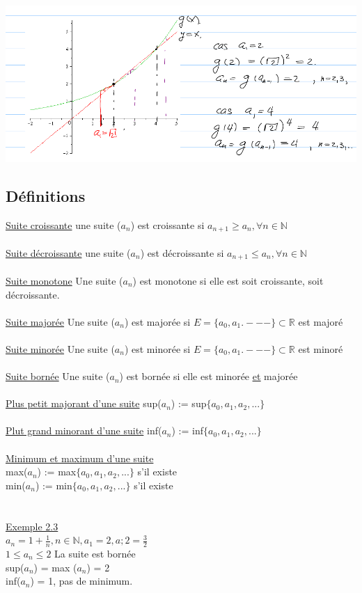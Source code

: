 \documentclass[12pt,a4paper]{article}
\newcommand{\R}{\ensuremath{\mathbb{R}} }
\newcommand{\N}{\ensuremath{\mathbb{N}} }
\begin{document}
{\begin{itemize}
\includegraphics[scale=0.5]{illustrations_Analyse/sqrt2}
\end{itemize}
\subsection{Définitions}
\underline{Suite croissante} une suite ($a_n$) est croissante si $a_{n+1} \geq a_n, \forall n \in \N$\\
\\
\underline{Suite décroissante} une suite ($a_n$) est décroissante si $a_{n+1} \leq a_n, \forall n \in \N$\\
\\
\underline{Suite monotone} Une suite ($a_n$) est monotone si elle est soit croissante, soit décroissante.\\
\\
\underline{Suite majorée} Une suite ($a_n$) est majorée si $E = \{a_0,a_1.---\} \subset \R$ est majoré\\
\\
\underline{Suite minorée} Une suite ($a_n$) est minorée si $E = \{a_0,a_1.---\} \subset \R$ est minoré\\
\\
\underline{Suite bornée} Une suite ($a_n$) est bornée si elle est minorée \underline{\underline{et}} majorée\\
\\
\underline{Plus petit majorant d'une suite} sup($a_n$) := sup$\{a_0,a_1,a_2,...\}$\\
\\
\underline{Plut grand minorant d'une suite} inf($a_n$) := inf$\{a_0,a_1,a_2,...\}$\\
\\
\underline{Minimum et maximum d'une suite}\\
max($a_n$) := max$\{a_0,a_1,a_2,...\}$ s'il existe\\
min($a_n$) := min$\{a_0,a_1,a_2,...\}$ s'il existe\\
\\
\\
\underline{Exemple 2.3}\\
$a_n = 1+ \frac{1}{n}, n \in \N
, a_1 = 2, a;2 = \frac{3}{2}$\\
$1\leq a_n \leq 2$ La suite est bornée\\
sup($a_n$) = max ($a_n$) = 2\\
inf($a_n$) = 1, pas de minimum.

}
\end{document}
